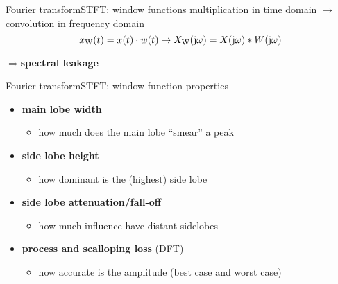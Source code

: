 	\begin{frame}{Fourier transform}{STFT: window functions}
		multiplication in time domain $\rightarrow$ convolution in frequency domain
        \begin{equation*}
            x_\mathrm{W}(t) = x(t)\cdot w(t) \rightarrow X_\mathrm{W}(\mathrm{j}\omega) = X(\mathrm{j}\omega) \ast W(\mathrm{j}\omega)
        \end{equation*}

		\pause		
		$\Rightarrow$\textbf{spectral leakage}
	\end{frame}	

	\begin{frame}{Fourier transform}{STFT: window function properties}
		\begin{itemize}
			\item	\textbf{main lobe width}
                \begin{itemize}
                    \item   how much does the main lobe ``smear'' a peak
                \end{itemize}
            \bigskip
			\item<2->	\textbf{side lobe height}
                \begin{itemize}
                    \item   how dominant is the (highest) side lobe
                \end{itemize}
			\bigskip
            \item<3->	\textbf{side lobe attenuation/fall-off}
                \begin{itemize}
                    \item   how much influence have distant sidelobes
                \end{itemize}
            \bigskip
            \item<4->\textbf{process and scalloping loss} (DFT)
                \begin{itemize}
                    \item   how accurate is the amplitude (best case and worst case)
                \end{itemize}
		\end{itemize}
	\end{frame}	

